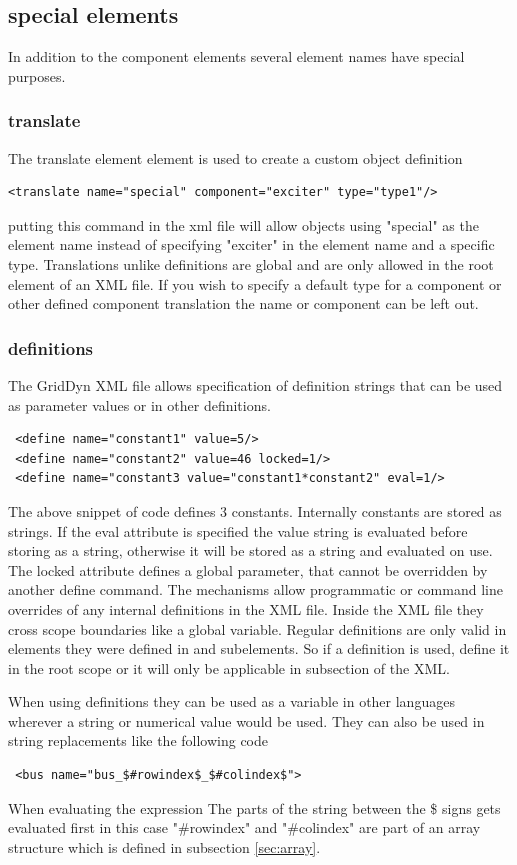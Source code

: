 \documentclass[12pt]{article} %
\begin{document}
\subsection{special elements}
In addition to the component elements several element names have special purposes.  
\subsubsection{translate}
The translate element element is used to create a custom object definition
\begin{lstlisting}
<translate name="special" component="exciter" type="type1"/>  
\end{lstlisting}
putting this command in the xml file will allow objects using "special" as the element name instead of specifying "exciter" in the element name and a specific type.  Translations unlike definitions are global and are only allowed in the root element of an XML file.  If you wish to specify a default type for a component or other defined component translation the name or component can be left out.  

\subsubsection{definitions}
The GridDyn XML file allows specification of definition strings that can be used as parameter values or in other definitions. 
 \begin{lstlisting}
 <define name="constant1" value=5/>
 <define name="constant2" value=46 locked=1/>
 <define name="constant3 value="constant1*constant2" eval=1/>  
 \end{lstlisting}
 
 The above snippet of code defines 3 constants.  Internally constants are stored as strings.  If the eval attribute is specified the value string is evaluated before storing as a string, otherwise it will be stored as a string and evaluated on use.   The locked attribute defines a global parameter, that cannot be overridden by another define command.  The mechanisms allow programmatic or command line overrides of any internal definitions in the XML file.  Inside the XML file they cross scope boundaries like a global variable.  Regular definitions are only valid in elements they were defined in and subelements.  So if a definition is used, define it in the root scope or it will only be applicable in subsection of the XML.  
 
 When using definitions they can be used as a variable in other languages wherever a string or numerical value would be used.  They can also be used in string replacements like the following code
 \begin{lstlisting}
 <bus name="bus_$#rowindex$_$#colindex$">
 \end{lstlisting}
 When evaluating the expression The parts of the string between the \$ signs gets evaluated first in this case "\#rowindex" and "\#colindex" are part of an array structure which is defined in subsection \ref{sec:array}. 
 
\end{document}
